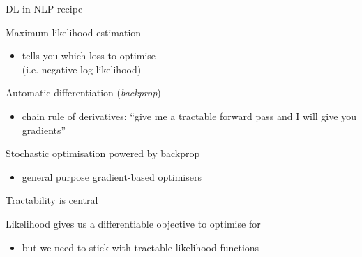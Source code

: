 \begin{frame}{DL in NLP recipe}



	Maximum likelihood estimation
	\begin{itemize}
		\item  tells you which \alert{loss} to optimise \\
		(i.e. negative log-likelihood)
	\end{itemize}
	
	\pause
	Automatic differentiation (\emph{backprop})
	\begin{itemize}
		\item chain rule of derivatives: ``give me a tractable forward pass and I will give you \alert{gradients}''
	\end{itemize}
	
	\pause
	Stochastic optimisation powered by backprop
	\begin{itemize}
		\item general purpose gradient-based optimisers
	\end{itemize}

\end{frame}


\begin{frame}{Tractability is central}

Likelihood gives us a differentiable objective to optimise for
\begin{itemize}
	\item but we need to stick with \alert{tractable} likelihood functions
\end{itemize}




\end{frame}

